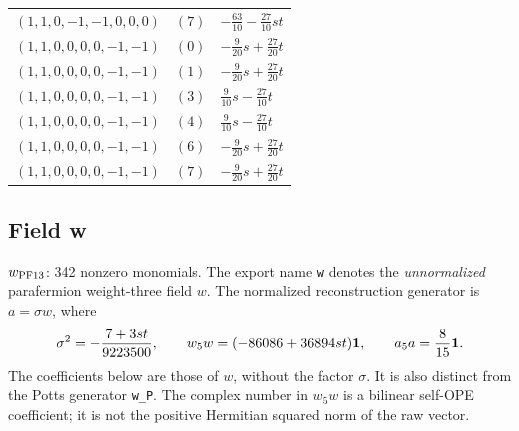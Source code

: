 \begin{longtable}{@{}lll@{}}
$(1,1,0,-1,-1,0,0,0)$ & $(7)$ & $-\frac{63}{10}-\frac{27}{10}st$\\
$(1,1,0,0,0,0,-1,-1)$ & $(0)$ & $-\frac{9}{20}s+\frac{27}{20}t$\\
$(1,1,0,0,0,0,-1,-1)$ & $(1)$ & $-\frac{9}{20}s+\frac{27}{20}t$\\
$(1,1,0,0,0,0,-1,-1)$ & $(3)$ & $\frac{9}{10}s-\frac{27}{10}t$\\
$(1,1,0,0,0,0,-1,-1)$ & $(4)$ & $\frac{9}{10}s-\frac{27}{10}t$\\
$(1,1,0,0,0,0,-1,-1)$ & $(6)$ & $-\frac{9}{20}s+\frac{27}{20}t$\\
$(1,1,0,0,0,0,-1,-1)$ & $(7)$ & $-\frac{9}{20}s+\frac{27}{20}t$\\
\end{longtable}
\endgroup

\subsection{Field w}
$w_{\rm PF13}$: 342 nonzero monomials.
The export name \texttt{w} denotes the \emph{unnormalized}
parafermion weight-three field $w$. The normalized reconstruction
generator is $a=\sigma w$, where
\[
\sigma^2=-\frac{7+3st}{9223500},\qquad
w_5w=(-86086+36894st)\mathbf1,\qquad a_5a=\frac8{15}\mathbf1.
\]
The coefficients below are those of $w$, without the factor $\sigma$.
It is also distinct from the Potts generator \texttt{w\_P}.
The complex number in $w_5w$ is a bilinear self-OPE coefficient;
it is not the positive Hermitian squared norm of the raw vector.

